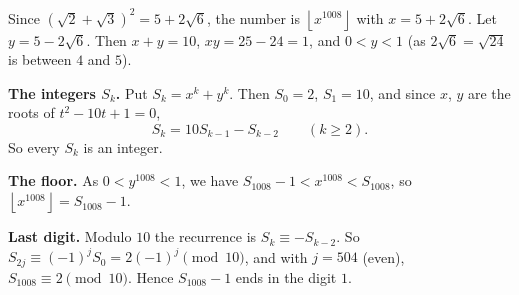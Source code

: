 Since $\left(\sqrt2+\sqrt3\right)^2=5+2\sqrt6$, the number is $\left\lfloor x^{1008}\right\rfloor$ with $x=5+2\sqrt6$. Let $y=5-2\sqrt6$. Then $x+y=10$, $xy=25-24=1$, and $0<y<1$ (as $2\sqrt6=\sqrt{24}$ is between $4$ and $5$).

\textbf{The integers $S_k$.} Put $S_k=x^k+y^k$. Then $S_0=2$, $S_1=10$, and since $x$, $y$ are the roots of $t^2-10t+1=0$,
\[
S_k=10S_{k-1}-S_{k-2}\qquad(k\ge2).
\]
So every $S_k$ is an integer.

\textbf{The floor.} As $0<y^{1008}<1$, we have $S_{1008}-1<x^{1008}<S_{1008}$, so $\left\lfloor x^{1008}\right\rfloor=S_{1008}-1$.

\textbf{Last digit.} Modulo $10$ the recurrence is $S_k\equiv-S_{k-2}$. So $S_{2j}\equiv(-1)^jS_0=2(-1)^j\pmod{10}$, and with $j=504$ (even), $S_{1008}\equiv2\pmod{10}$. Hence $S_{1008}-1$ ends in the digit $\boxed{1}$.
